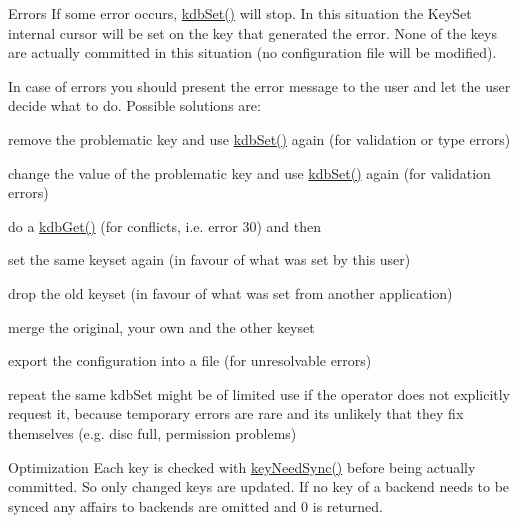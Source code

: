 \begin{DoxyParagraph}{Errors}
If some error occurs, \hyperlink{group__kdb_ga11436b058408f83d303ca5e996832bcf}{kdb\-Set()} will stop. In this situation the Key\-Set internal cursor will be set on the key that generated the error. None of the keys are actually committed in this situation (no configuration file will be modified).
\end{DoxyParagraph}
In case of errors you should present the error message to the user and let the user decide what to do. Possible solutions are\-:
\begin{DoxyItemize}
\item remove the problematic key and use \hyperlink{group__kdb_ga11436b058408f83d303ca5e996832bcf}{kdb\-Set()} again (for validation or type errors)
\item change the value of the problematic key and use \hyperlink{group__kdb_ga11436b058408f83d303ca5e996832bcf}{kdb\-Set()} again (for validation errors)
\item do a \hyperlink{group__kdb_ga28e385fd9cb7ccfe0b2f1ed2f62453a1}{kdb\-Get()} (for conflicts, i.\-e. error 30) and then
\begin{DoxyItemize}
\item set the same keyset again (in favour of what was set by this user)
\item drop the old keyset (in favour of what was set from another application)
\item merge the original, your own and the other keyset
\end{DoxyItemize}
\item export the configuration into a file (for unresolvable errors)
\item repeat the same kdb\-Set might be of limited use if the operator does not explicitly request it, because temporary errors are rare and its unlikely that they fix themselves (e.\-g. disc full, permission problems)
\end{DoxyItemize}

\begin{DoxyParagraph}{Optimization}
Each key is checked with \hyperlink{group__keytest_gaf247df0de7aca04b32ef80e39ef12950}{key\-Need\-Sync()} before being actually committed. So only changed keys are updated. If no key of a backend needs to be synced any affairs to backends are omitted and 0 is returned.
\end{DoxyParagraph}

